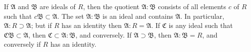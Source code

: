 If $\mathfrak{A}$ and $\mathfrak{B}$ are ideals of $R$, then the quotient $\mathfrak{A} : \mathfrak{B}$ consists of all elements $c$ of $R$ such that $c\mathfrak{B} \subset \mathfrak{A}$. The set $\mathfrak{A} : \mathfrak{B}$ is an ideal and contains $\mathfrak{A}$. In particular, $\mathfrak{A} : R \supset \mathfrak{A}$; but if $R$ has an identity then $\mathfrak{A} : R = \mathfrak{A}$. If $\mathfrak{C}$ is any ideal such that $\mathfrak{C}\mathfrak{B} \subset \mathfrak{A}$, then $\mathfrak{C} \subset \mathfrak{A} : \mathfrak{B}$, and conversely. If $\mathfrak{A} \supset \mathfrak{B}$, then $\mathfrak{A} : \mathfrak{B} = R$, and conversely if $R$ has an identity.
